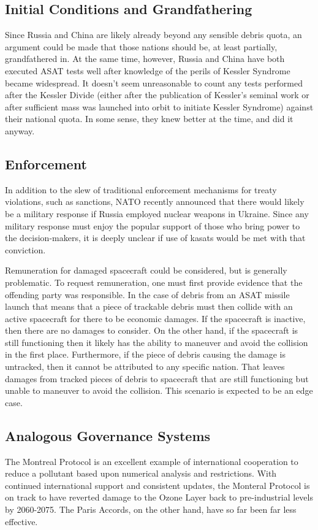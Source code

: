 \subsection{Initial Conditions and Grandfathering}
Since Russia and China are likely already beyond any sensible debris
quota, an argument could be made that those nations should be, at
least partially, grandfathered in.  At the same time, however, Russia
and China have both executed ASAT tests well after knowledge of the
perils of Kessler Syndrome became widespread.  It doesn't seem
unreasonable to count any tests performed after the Kessler Divide
(either after the publication of Kessler's seminal work or after
sufficient mass was launched into orbit to initiate Kessler Syndrome)
against their national quota.  In some sense, they knew better at the
time, and did it anyway.

\subsection{Enforcement}
In addition to the slew of traditional enforcement mechanisms for
treaty violations, such as sanctions, NATO recently announced that
there would likely be a military response if Russia employed nuclear
weapons in Ukraine.\cite[nato reaction]{xxx} Since any military
response must enjoy the popular support of those who bring power to
the decision-makers, it is deeply unclear if use of \acp{kasat} would
be met with that conviction.

Remuneration for damaged spacecraft could be considered, but is
generally problematic.  To request remuneration, one must first
provide evidence that the offending party was responsible.  In the
case of debris from an ASAT missile launch that means that a piece of
trackable debris must then collide with an active spacecraft for there
to be economic damages.  If the spacecraft is inactive, then there are
no damages to consider.  On the other hand, if the spacecraft is still
functioning then it likely has the ability to maneuver and avoid the
collision in the first place.  Furthermore, if the piece of debris
causing the damage is untracked, then it cannot be attributed to any
specific nation.  That leaves damages from tracked pieces of debris to
spacecraft that are still functioning but unable to maneuver to avoid
the collision.  This scenario is expected to be an edge case.


\subsection{Analogous Governance Systems}
The Montreal Protocol is an excellent example of international
cooperation to reduce a pollutant based upon numerical analysis and
restrictions.\cite{oh-canada} With continued international support and
consistent updates, the Monteral Protocol is on track to have reverted
damage to the Ozone Layer back to pre-industrial levels by
2060-2075.\cite{oh-canada}  The Paris Accords, on the other hand, have
so far been far less effective.\cite{lousy-paris}

